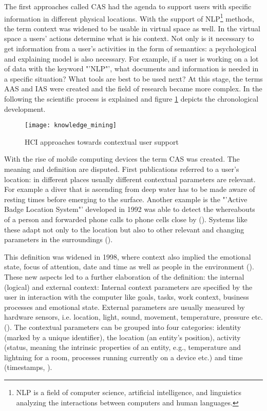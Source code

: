 The first approaches called \ac{CAS} had the agenda to support users with specific information in different physical locations. With the support of \ac{NLP}\footnote{NLP is a field of computer science, artificial intelligence, and linguistics analyzing the interactions between computers and human languages.} methods, the term context was widened to be usable in virtual space as well. In the virtual space a users' actions determine what is his context. Not only is it necessary to get information from a user's activities in the form of semantics: a psychological and explaining model is also necessary. For example, if a user is working on a lot of data with the keyword "'NLP"', what documents and information is needed in a specific situation? What tools are best to be used next? At this stage, the terms \ac{AAS} and \ac{IAS} were created and the field of research became more complex. In the following the scientific process is explained and figure \ref{fig3} depicts the chronological development.


\begin{figure}[ht]
	\centering
  \texttt{[image: knowledge\_mining]}
	\caption{HCI approaches towards contextual user support}
	\label{fig3}
\end{figure}

 With the rise of mobile computing devices the term \ac{CAS} was created. The meaning and definition are disputed. First publications referred to a user's location: in different places usually different contextual parameters are relevant. For example a diver that is ascending from deep water has to be made aware of resting times before emerging to the surface. Another example is the "'Active Badge Location System"' developed in 1992 was able to detect the whereabouts of a person and forwarded phone calls to phone cells close by (\cite{want1992active}). Systems like these adapt not only to the location but also to other relevant and changing parameters in the surroundings (\cite{schilit1994context}). 

This definition was widened in 1998, where context also implied the emotional state, focus of attention, date and time as well as people in the environment (\cite{dey1998context}). These new aspects led to a further elaboration of the definition: the internal (logical) and external context: Internal context parameters are specified by the user in interaction with the computer like goals, tasks, work context, business processes and emotional state. External parameters are usually measured by hardware sensors, i.e. location, light, sound, movement, temperature, pressure etc. (\cite{hofer2003context}). The contextual parameters can be grouped into four categories: identity (marked by a unique identifier), the location (an entity’s position), activity (status, meaning the intrinsic properties of an entity, e.g., temperature and lightning for a room, processes running currently on a device etc.) and time (timestamps, \cite{dey2001conceptual}). 

